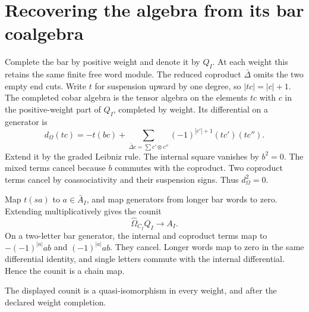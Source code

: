\section{Recovering the algebra from its bar coalgebra}

Complete the bar by positive weight and denote it by $Q_I$.
At each weight this retains the same finite free word module.
The reduced coproduct $\bar\Delta$ omits the two empty end cuts.
Write $t$ for suspension upward by one degree, so $|tc|=|c|+1$.
The completed cobar algebra is the tensor algebra on the elements
$tc$ with $c$ in the positive-weight part of $Q_I$, completed by
weight. Its differential on a generator is
\[
 d_\Omega(tc)=-t(bc)
 +\sum_{\bar\Delta c=\sum c'\otimes c''}
       (-1)^{|c'|+1}(tc')(tc'').
\]
Extend it by the graded Leibniz rule.
The internal square vanishes by $b^2=0$.
The mixed terms cancel because $b$ commutes with the coproduct.
Two coproduct terms cancel by coassociativity and their suspension
signs. Thus $d_\Omega^2=0$.

Map $t(sa)$ to $a\in\bar A_I$, and map generators from longer
bar words to zero. Extending multiplicatively gives the counit
\[
 \widehat\Omega_{C_I}Q_I\longrightarrow A_I.
\]
On a two-letter bar generator, the internal and coproduct terms
map to $-(-1)^{|a|}ab$ and $(-1)^{|a|}ab$.
They cancel. Longer words map to zero in the same differential
identity, and single letters commute with the internal
differential. Hence the counit is a chain map.

\begin{theorem}\label{thm:ocb-reconstruction}
The displayed counit is a quasi-isomorphism in every weight,
and after the declared weight completion.
\end{theorem}

